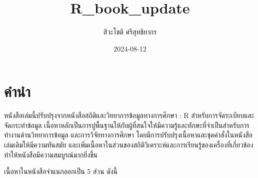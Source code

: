 \documentclass[
  a4paper,
]{book}
\title{R\_book\_update}
\author{สิวะโชติ ศรีสุทธิยากร}
\date{2024-08-12}
\renewcommand*\contentsname{Table of contents}
\newcommand\contentsname{Table of contents}
\begin{document}
\frontmatter
\maketitle

\renewcommand*\contentsname{Table of contents}
{
\setcounter{tocdepth}{2}
\tableofcontents
}

\mainmatter
{}

\chapter*{คำนำ}\label{uxe04uxe33uxe19uxe33}


หนังสือเล่มนี้ปรับปรุงจากหนังสือสถิติและวิทยาการข้อมูลทางการศึกษา : R
สำหรับการจัดระเบียบและจัดกระทำข้อมูล
เนื้อหาหลักเป็นการปูพื้นฐานให้กับผู้ที่สนใจให้มีความรู้และทักษะที่จำเป็นสำหรับการทำงานด้านวิทยาการข้อมูล
และการวิจัยทางการศึกษา โดยมีการปรับปรุงเนื้อหาและชุดคำสั่งในหนังสือเล่มเดิมให้มีความทันสมัย
และเพิ่มเนื้อหาในส่วนของสถิติวิเคราะห์และการเรียนรู้ของเครื่องที่เกี่ยวข้องทำให้หนังสือมีความสมบูรณ์มากยิ่งขึ้น

เนื้อหาในหนังสือจำแนกออกเป็น 5 ส่วน ดังนี้
\end{document}
